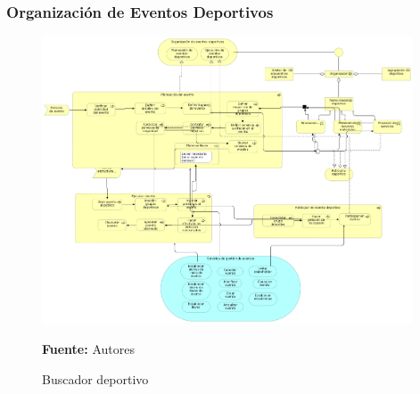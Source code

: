 \subsubsection{Organización de Eventos Deportivos}

\begin{figure}[!htb]
  \begin{center}
    \includegraphics[width=11cm]{./imagenes/business_process/organizacioneventosdeportivos.png}
    \caption{Buscador deportivo}
    \label{fig:BF_BuscadorDeportivo}
    \textbf{Fuente:}  Autores
  \end{center}
\end{figure}

